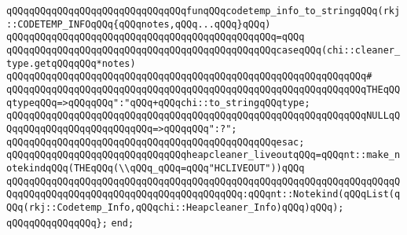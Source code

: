 \newline
\newline
\verb|qQQqqQQqqQQqqQQqqQQqqQQqqQQqqQQqfunqQQqcodetemp_info_to_stringqQQq(rkj::CODETEMP_INFOqQQq{qQQqnotes,qQQq...qQQq}qQQq)|\newline
\verb|qQQqqQQqqQQqqQQqqQQqqQQqqQQqqQQqqQQqqQQqqQQqqQQq=qQQq|\newline
\verb|qQQqqQQqqQQqqQQqqQQqqQQqqQQqqQQqqQQqqQQqqQQqqQQqcaseqQQq(chi::cleaner_type.getqQQqqQQq*notes)|\newline
\verb|qQQqqQQqqQQqqQQqqQQqqQQqqQQqqQQqqQQqqQQqqQQqqQQqqQQqqQQqqQQqqQQq#|\newline
\verb|qQQqqQQqqQQqqQQqqQQqqQQqqQQqqQQqqQQqqQQqqQQqqQQqqQQqqQQqqQQqqQQqTHEqQQqtypeqQQq=>qQQqqQQq":"qQQq+qQQqchi::to_stringqQQqtype;|\newline
\verb|qQQqqQQqqQQqqQQqqQQqqQQqqQQqqQQqqQQqqQQqqQQqqQQqqQQqqQQqqQQqqQQqNULLqQQqqQQqqQQqqQQqqQQqqQQqqQQq=>qQQqqQQq":?";|\newline
\verb|qQQqqQQqqQQqqQQqqQQqqQQqqQQqqQQqqQQqqQQqqQQqqQQqesac;|\newline
\newline
\newline
\verb|qQQqqQQqqQQqqQQqqQQqqQQqqQQqqQQqheapcleaner_liveoutqQQq=qQQqnt::make_notekindqQQq(THEqQQq(\\qQQq_qQQq=qQQq"HCLIVEOUT"))qQQq|\newline
\verb|qQQqqQQqqQQqqQQqqQQqqQQqqQQqqQQqqQQqqQQqqQQqqQQqqQQqqQQqqQQqqQQqqQQqqQQqqQQqqQQqqQQqqQQqqQQqqQQqqQQqqQQqqQQqqQQq:qQQqnt::Notekind(qQQqList(qQQq(rkj::Codetemp_Info,qQQqchi::Heapcleaner_Info)qQQq)qQQq);|\newline
\verb|qQQqqQQqqQQqqQQq};|\newline
\verb|end;|\newline

